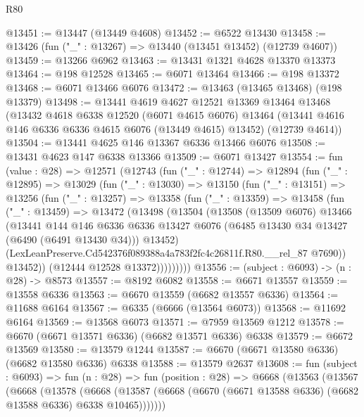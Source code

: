 \begin{lexlean}{R80}
\begin{coremodule}
@13451 := @13447 (@13449 @4608)
@13452 := @6522 @13430
@13458 := @13426 (fun ("_" : @13267) => @13440 (@13451 @13452) (@12739 @4607))
@13459 := @13266 @6962
@13463 := @13431 @1321 @4628 @13370 @13373
@13464 := @198 @12528
@13465 := @6071 @13464
@13466 := @198 @13372
@13468 := @6071 @13466 @6076
@13472 := @13463 (@13465 @13468) (@198 @13379)
@13498 := @13441
    @4619
    @4627
    @12521
    @13369
    @13464
    @13468
    (@13432
      @4618
      @6338
      @12520
      (@6071 @4615 @6076)
      @13464
      (@13441 @4616 @146 @6336 @6336 @4615 @6076 (@13449 @4615) @13452)
      (@12739 @4614))
@13504 := @13441 @4625 @146 @13367 @6336 @13466 @6076
@13508 := @13431 @4623 @147 @6338 @13366
@13509 := @6071 @13427
@13554 := fun (value : @28) =>
  @12571
    (@12743
      (fun ("_" : @12744) =>
      @12894
        (fun ("_" : @12895) =>
        @13029
          (fun ("_" : @13030) =>
          @13150
            (fun ("_" : @13151) =>
            @13256
              (fun ("_" : @13257) =>
              @13358
                (fun ("_" : @13359) =>
                @13458
                  (fun ("_" : @13459) =>
                  @13472
                    (@13498
                      (@13504
                        (@13508
                          (@13509 @6076)
                          @13466
                          (@13441
                            @144
                            @146
                            @6336
                            @6336
                            @13427
                            @6076
                            (@6485 @13430 @34 @13427 (@6490 (@6491 @13430 @34)))
                            @13452)
                          (LexLeanPreserve.Cd542376f089388a4a783f2fc4c26811f.R80.__rel_87 @7690))
                        @13452))
                    (@12444 @12528 @13372)))))))))
@13556 := (subject : @6093) -> (n : @28) -> @8573
@13557 := @8192 @6082
@13558 := @6671 @13557
@13559 := @13558 @6336
@13563 := @6670 @13559 (@6682 @13557 @6336)
@13564 := @11688 @6164
@13567 := @6335 (@6666 (@13564 @6073))
@13568 := @11692 @6164
@13569 := @13568 @6073
@13571 := @7959 @13569 @1212
@13578 := @6670 (@6671 @13571 @6336) (@6682 @13571 @6336) @6338
@13579 := @6672 @13569
@13580 := @13579 @1244
@13587 := @6670 (@6671 @13580 @6336) (@6682 @13580 @6336) @6338
@13588 := @13579 @2637
@13608 := fun (subject : @6093) =>
  fun (n : @28) =>
  fun (position : @28) =>
  @6668
    (@13563
      (@13567
        (@6668
          (@13578
            (@6668
              (@13587 (@6668 (@6670 (@6671 @13588 @6336) (@6682 @13588 @6336) @6338 @10465)))))))

\end{coremodule}
\end{lexlean}
